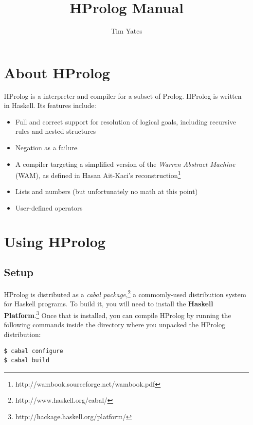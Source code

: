 \documentclass[11pt]{report}
\title{HProlog Manual}
\author{Tim Yates}
\begin{document}
\maketitle

\tableofcontents


%
%

\chapter{About HProlog}

HProlog is a interpreter and compiler for a subset of Prolog. HProlog is written in Haskell. Its features include:

\begin{itemize}
\item Full and correct support for resolution of logical goals, including recursive rules and nested structures
\item Negation as a failure
\item A compiler targeting a simplified version of the \emph{Warren Abstract Machine} (WAM), as defined in Hasan Ait-Kaci's reconstruction\footnote{http://wambook.sourceforge.net/wambook.pdf}
\item Lists and numbers (but unfortunately no math at this point)
\item User-defined operators
\end{itemize}


%
%

\chapter{Using HProlog}

\section{Setup}

HProlog is distributed as a \emph{cabal package},\footnote{http://www.haskell.org/cabal/} a commomly-used distribution system for Haskell programs. To build it, you will need to install the \textbf{Haskell Platform}.\footnote{http://hackage.haskell.org/platform/} Once that is installed, you can compile HProlog by running the following commands inside the directory where you unpacked the HProlog distribution:

\begin{verbatim}
$ cabal configure
$ cabal build
\end{verbatim}
\end{document}
